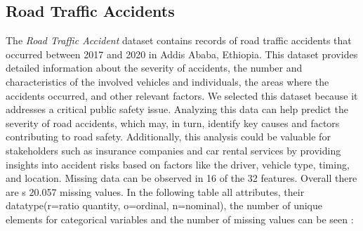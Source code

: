 \documentclass{article}
\begin{document}
\subsection{Road Traffic Accidents}
The \textit{Road Traffic Accident} dataset contains records of road traffic accidents that occurred between 2017 and 2020 in Addis Ababa, Ethiopia. This dataset provides detailed information about the severity of accidents, the number and characteristics of the involved vehicles and individuals, the areas where the accidents occurred, and other relevant factors.
We selected this dataset because it addresses a critical public safety issue. Analyzing this data can help predict the severity of road accidents, which may, in turn, identify key causes and factors contributing to road safety. Additionally, this analysis could be valuable for stakeholders such as insurance companies and car rental services by providing insights into accident risks based on factors like the driver, vehicle type, timing, and location.
\newline
Missing data can be observed in 16 of the 32 features. Overall there are s 20.057 missing values. In the following table all attributes, their datatype(r=ratio quantity, o=ordinal, n=nominal), the number of unique elements for categorical variables and the number of missing values can be seen :
\setlength{\tabcolsep}{1pt} %
\end{document}
